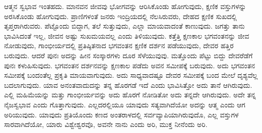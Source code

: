 \newpage

ಆತ್ಮನ ಸ್ವಭಾವ ಇಂತಹದು. ಮಾನವನ ಜೀವವು ಭೋಗವನ್ನು ಆರಿಸಿಕೊಂಡು ಹೋಗುವುದು, ಕ್ಷಣಿಕ ವಸ್ತುಗಳನ್ನು ಅರಸಿಕೊಂಡು ಹೋಗುವುದು. ಪ್ರಾಣಿಗಳಂತೆ ಜನರು ಇಂದ್ರಿಯದಲ್ಲಿ ನೆಲಸಿರುವರು, ದೇಹದ ಕ್ಷಣಿಕ ಸುಖದಲ್ಲಿ ತೃಪ್ತರಾಗಿರುವರು. ಪೆಟ್ಟೊಂದು ಬಿದ್ದಾಗ, ತಲೆ ಸುತ್ತುವುದು, ಎಲ್ಲಾ ಮಾಯವಾದಂತೆ ಕಾಣುವುದು. ಜಗತ್ತು ತಾನು ಭಾವಿಸಿದಂತೆ ಇಲ್ಲ, ಜೀವನ ಅಷ್ಟು ಸುಖಮಯವಲ್ಲ ಎಂದು ತಿಳಿಯುವುದು. ಕತ್ತೆತ್ತಿ ಕ್ಷಣಕಾಲ ಭಗವಂತನನ್ನು ಜೀವ ನೋಡುವುದು, ಗಾಂಭೀರ್ಯದಲ್ಲಿ ಪ್ರತಿಷ್ಠಿತನಾದ ಭಗವಂತನ ಕ್ಷಣಿಕ ದರ್ಶನ ಪಡೆಯುವುದು, ದೇವರ ಹತ್ತಿರ ಬರುವುದು. ಆದರೆ ಪುನಃ ಅದನ್ನು ಹೀನ ಸಂಸ್ಕಾರಗಳು ದೂರ ಸೆಳೆಯುವುವು. ಮತ್ತೊಂದು ಪೆಟ್ಟು ಬಿದ್ದು ದೇವರೆಡೆಗೆ ಪುನಃ ಕಳುಹಿಸುವುದು. ಭಗವಂತನ ದರ್ಶನವನ್ನು ಕ್ಷಣಕಾಲ ಪಡೆದು ಅವನ ಸಮೀಪಕ್ಕೆ ಬರುವುದು. ಅದು ಭಗವಂತನ ಸಮೀಪಕ್ಕೆ ಬಂದಂತೆಲ್ಲ ಪ್ರಕೃತಿ ಮಾಯವಾಗುವುದು. ಅದು ಸಾಧ್ಯವಾದಷ್ಟೂ ದೇವರ ಸಮೀಪಕ್ಕೆ ಬಂದ ಮೇಲೆ ದೃಶ್ಯವೆಲ್ಲ ಬದಲಾಗುವುದು. ಯಾವ ಅನಂತವಾದುದನ್ನು ತನ್ನ ಹೊರಗಡೆ ಇದೆ ಎಂದು ಭಾವಿಸಿತ್ತೋ ಅದು ತಾನೆ ಆಗಿರುವುದು. ಎಲ್ಲಿ ಮಹಿಮೆಯನ್ನು ಮತ್ತು ಗಾಂಭೀರ್ಯವನ್ನು ಅದು ಹೊರಗೆ ನೋಡಿತೋ ಅದು ತನ್ನದೇ ಆಗಿರುವುದು. ಅದೇ ತನ್ನ ನೈಜಸ್ವಭಾವ ಎಂದು ಗೊತ್ತಾಗುವುದು. ಎಲ್ಲದರಲ್ಲಿಯೂ ಯಾವುದು ಸತ್ಯವಾಗಿದೆಯೋ ಅದನ್ನು ಆತ್ಮ ಎಂದು ಆಗ ಅರಿಯುವುದು. ಯಾವುದು ಪ್ರತಿಯೊಂದು ಕಣದ ಅಂತರಾಳದಲ್ಲಿ ಸರ್ವವ್ಯಾಪಿಯಾಗಿರುವುದೊ, ಎಲ್ಲ ವಸ್ತುಗಳ ಸಾರವಾಗಿದೆಯೋ, ಯಾರು ವಿಶ್ವೇಶ್ವರವೊ, ಅವನೇ ನಾನು ಎಂದು ಅರಿ, ಮುಕ್ತ ನೀನೆಂದು ಅರಿ.

